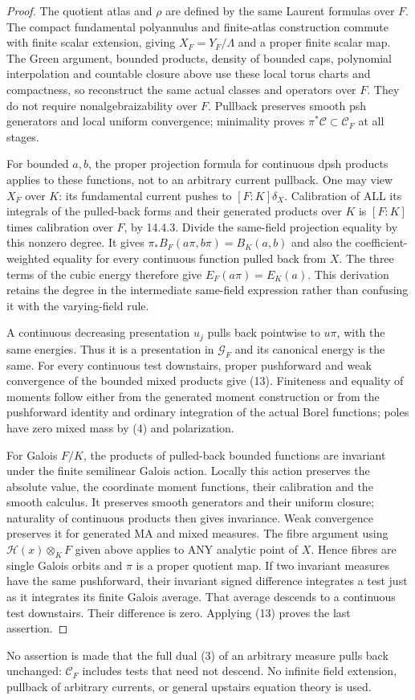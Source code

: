 \documentclass[11pt]{article}
\newcommand{\C}{\mathcal C}
\newcommand{\G}{\mathcal G}
\begin{document}
\begin{proof}
The quotient atlas and $\rho$ are defined by the same Laurent formulas over
$F$. The compact fundamental polyannulus and finite-atlas construction
commute with finite scalar extension, giving $X_F=Y_F/\Lambda$ and a proper
finite scalar map. The Green argument, bounded products, density of bounded
caps, polynomial interpolation and countable closure above use these local
torus charts and compactness, so reconstruct the same actual classes and
operators over $F$. They do not require nonalgebraizability over $F$.
Pullback preserves smooth psh generators and local uniform convergence;
minimality proves $\pi^*\C\subset\C_F$ at all stages.

For bounded $a,b$, the proper projection formula for continuous dpsh products
applies to these functions, not to an arbitrary current pullback.
One may view $X_F$ over $K$: its fundamental current pushes to
$[F:K]\delta_X$. Calibration of ALL its integrals of the pulled-back forms
and their generated products over $K$ is $[F:K]$ times calibration over $F$,
by 14.4.3. Divide the same-field projection equality by this nonzero degree.
It gives
$\pi_*B_F(a\pi,b\pi)=B_K(a,b)$ and also the coefficient-weighted equality
for every continuous function pulled back from $X$.
The three terms of the cubic energy therefore give
$E_F(a\pi)=E_K(a)$. This derivation retains the degree in the intermediate
same-field expression rather than confusing it with the varying-field rule.

A continuous decreasing presentation $u_j$ pulls back pointwise to $u\pi$,
with the same energies. Thus it is a presentation in $\G_F$ and its canonical
energy is the same. For every continuous test downstairs, proper pushforward
and weak convergence of the bounded mixed products give (13).
Finiteness and equality of moments follow either from the generated moment
construction or from the pushforward identity and ordinary integration of
the actual Borel functions; poles have zero mixed mass by (4) and polarization.

For Galois $F/K$, the products of pulled-back bounded functions are invariant
under the finite semilinear Galois action. Locally this action preserves the
absolute value, the coordinate moment functions, their calibration and the
smooth calculus. It preserves smooth generators and their uniform closure;
naturality of continuous products then gives invariance. Weak convergence
preserves it for generated MA and mixed measures.
The fibre argument using $\mathcal H(x)\otimes_KF$ given above applies to
ANY analytic point of $X$. Hence fibres are single Galois orbits and $\pi$
is a proper quotient map. If two invariant measures have the same pushforward,
their invariant signed difference integrates a test just as it integrates its
finite Galois average. That average descends to a continuous test downstairs.
Their difference is zero. Applying (13) proves the last assertion.
\end{proof}
No assertion is made that the full dual (3) of an arbitrary measure pulls
back unchanged: $\C_F$ includes tests that need not descend.
No infinite field extension, pullback of arbitrary currents, or general
upstairs equation theory is used.
\end{document}

